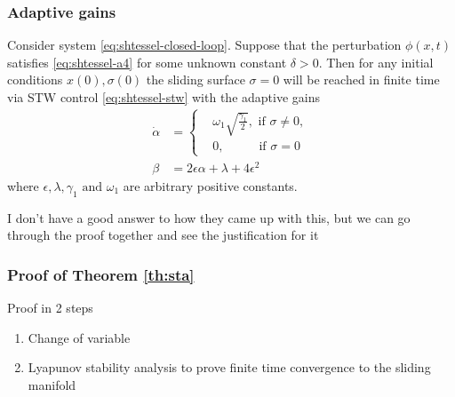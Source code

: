 \subsubsection{Adaptive gains}
    \begin{theorem}
      \label{th:sta}
      Consider system \eqref{eq:shtessel-closed-loop}. Suppose that the perturbation $\phi(x,t)$ satisfies \eqref{eq:shtessel-a4} for some unknown constant $\delta > 0$. Then for any initial conditions $x(0), \sigma(0)$ the sliding surface $\sigma = 0$ will be reached in finite time via STW control \eqref{eq:shtessel-stw} with the adaptive gains  
      \begin{equation}
        \begin{split}
          \dot{\alpha} &= 
          \begin{cases}
            &\omega_1 \sqrt{\frac{\gamma_1}{2}}, \text{ if } \sigma \neq 0, \\
            &0, \qquad\ \ \text{ if } \sigma = 0
          \end{cases} \\
          \beta &= 2\epsilon\alpha + \lambda + 4\epsilon^2
        \end{split}
        \label{eq:adaptation-law}
      \end{equation}
      where $\epsilon, \lambda, \gamma_1 \text{ and } \omega_1$ are arbitrary positive constants.
    \end{theorem}

\begin{rmk}
    I don't have a good answer to how they came up with this, but we can go through the proof together and see the justification for it
\end{rmk}

\subsubsection{Proof of Theorem \ref{th:sta}}
      Proof in 2 steps
      \begin{enumerate}
        \item Change of variable
        \item Lyapunov stability analysis to prove finite time convergence to the sliding manifold
      \end{enumerate}
      
